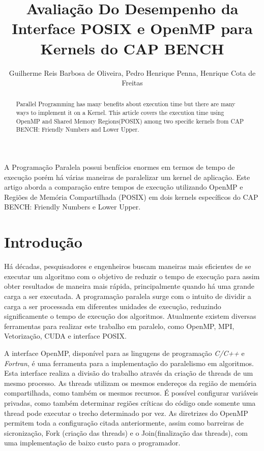 \documentclass[12pt]{article}
\title{Avaliação Do Desempenho da Interface POSIX e OpenMP para Kernels do CAP BENCH}
\author{Guilherme Reis Barbosa de Oliveira, Pedro Henrique Penna, Henrique Cota de Freitas}
\begin{document}
 

\maketitle

\begin{abstract}
    Parallel Programming has many benefits about execution time but there are many ways to implement it on a Kernel. This article covers the execution time using OpenMP and Shared Memory Regions(POSIX) among two specific kernels from CAP BENCH: Friendly Numbers and Lower Upper.
\end{abstract}
     
\begin{resumo} 
  A Programação Paralela possui benfícios enormes em termos de tempo de execução porém há várias maneiras de 
  paralelizar um kernel de aplicação. Este artigo aborda a comparação entre tempos de execução utilizando OpenMP e Regiões de Memória
  Compartilhada (POSIX) em dois kernels específicos do CAP BENCH: Friendly Numbers e Lower Upper. 
\end{resumo}


\section{Introdução}

Há décadas, pesquisadores e engenheiros buscam maneiras mais eficientes de se executar um algoritmo com o objetivo de reduzir o tempo de execução para assim obter resultados de maneira mais rápida, principalmente quando há uma grande carga a ser executada. A programação paralela surge com o intuito de dividir a carga a ser processada em diferentes unidades de execução, reduzindo significamente o tempo de execução dos algoritmos. Atualmente existem diversas ferramentas para realizar este trabalho em paralelo, como OpenMP, MPI, Vetorização, CUDA e interface POSIX.

A interface OpenMP, disponível para as lingugens de programação 
\textit{C/C++} e \textit{Fortran}, é uma ferramenta para a implementação do paralelismo em algoritmos. Esta interface realiza a divisão do trabalho através da criação de threads de um mesmo processo. As threads utilizam os mesmos endereços da região de memória compartilhada, como também os mesmos recursos. É possível configurar variáveis privadas, como também determinar regiões críticas do código onde somente uma thread pode executar o trecho determinado por vez. As diretrizes do OpenMP permitem toda a configuração citada anteriormente, assim como barreiras de sicronização, Fork (criação das threads) e o Join(finalização das threads), com uma implementação de baixo custo para o programador.
\end{document}
